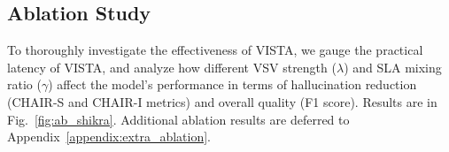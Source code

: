 \documentclass{article}
\newcommand{\ours}{{VISTA}\xspace}
\theoremstyle{plain}
\theoremstyle{definition}
\theoremstyle{remark}
\begin{document}
\begin{table}[h]
    \centering
    \vspace{-10pt}
    \caption{Impact of window size on SLA performance. Layer ranges (X-31) indicate the span of layers used for logit augmentation, where X varies from 27 to 31. C$_\text{S}$ and C$_\text{I}$ denote CHAIR$_\text{S}$ and CHAIR$_\text{I}$ metrics,  respectively.}
    \label{tab:ab_window_size}
    \vspace{-15pt}
\end{table}

\subsection{Ablation Study}
\label{sec:ablation}
To thoroughly investigate the effectiveness of \ours, we gauge the practical latency of \ours, and analyze how different VSV strength ($\lambda$) and SLA mixing ratio ($\gamma$) affect the model's performance in terms of hallucination reduction (CHAIR-S and CHAIR-I metrics) and overall quality (F1 score). Results are in Fig.~\ref{fig:ab_shikra}. Additional ablation results are deferred to Appendix~\ref{appendix:extra_ablation}.
\end{document}
